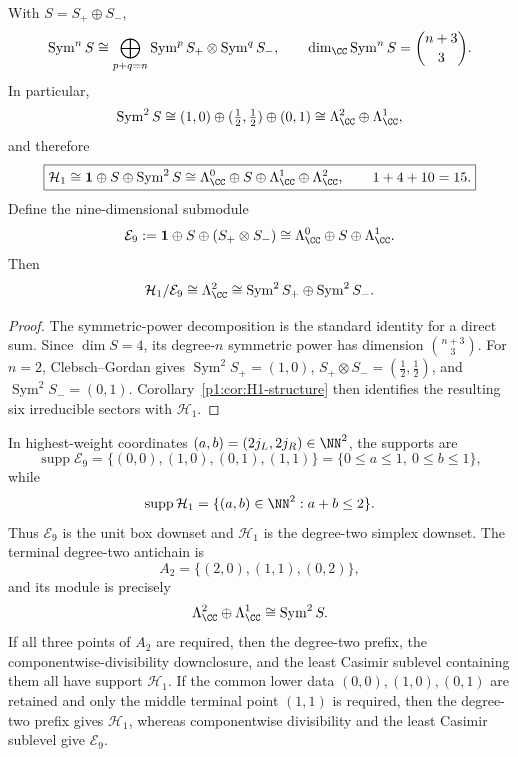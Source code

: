 \documentclass[11pt]{article}
\begin{document}
\begin{proposition}
\label{p1:prop:h1-symmetric-exterior-form}
With \(S=S_+\oplus S_-\),
\[
 \operatorname{Sym}^nS
 \cong
 \bigoplus_{p+q=n}
 \operatorname{Sym}^pS_+\otimes\operatorname{Sym}^qS_-,
 \qquad
 \dim_\CC\operatorname{Sym}^nS=\binom{n+3}{3}.
\]
In particular,
\[
 \operatorname{Sym}^2S
 \cong
 (1,0)\oplus(\tfrac12,\tfrac12)\oplus(0,1)
 \cong \Lambda^2_\CC\oplus\Lambda^1_\CC,
\]
and therefore
\[
 \boxed{
 \mathcal H_1
 \cong \mathbf1\oplus S\oplus\operatorname{Sym}^2S
 \cong \Lambda^0_\CC\oplus S\oplus\Lambda^1_\CC\oplus\Lambda^2_\CC,
 \qquad 1+4+10=15.}
\]
Define the nine-dimensional submodule
\[
 \mathcal E_9
 :=\mathbf1\oplus S\oplus(S_+\otimes S_-)
 \cong \Lambda^0_\CC\oplus S\oplus\Lambda^1_\CC.
\]
Then
\[
 \mathcal H_1/\mathcal E_9
 \cong\Lambda^2_\CC
 \cong\operatorname{Sym}^2S_+\oplus\operatorname{Sym}^2S_-.
\]
\end{proposition}

\begin{proof}
The symmetric-power decomposition is the standard identity for a direct sum.
Since \(\dim S=4\), its degree-\(n\) symmetric power has dimension
\(\binom{n+3}{3}\).  For \(n=2\), Clebsch--Gordan gives
\(\operatorname{Sym}^2S_+=(1,0)\),
\(S_+\otimes S_-=(\tfrac12,\tfrac12)\), and
\(\operatorname{Sym}^2S_-=(0,1)\).  Corollary~\ref{p1:cor:H1-structure}
then identifies the resulting six irreducible sectors with \(\mathcal H_1\).
\end{proof}

\begin{proposition}
\label{p1:prop:box-simplex-antichain}
In highest-weight coordinates \((a,b)=(2j_L,2j_R)\in\NN^2\), the supports are
\[
 \operatorname{supp}\mathcal E_9
 =\{(0,0),(1,0),(0,1),(1,1)\}
 =\{0\le a\le1,\ 0\le b\le1\},
\]
while
\[
 \operatorname{supp}\mathcal H_1
 =\{(a,b)\in\NN^2:a+b\le2\}.
\]
Thus \(\mathcal E_9\) is the unit box downset and \(\mathcal H_1\) is the
degree-two simplex downset.  The terminal degree-two antichain is
\[
 A_2=\{(2,0),(1,1),(0,2)\},
\]
and its module is precisely
\[
 \Lambda^2_\CC\oplus\Lambda^1_\CC
 \cong\operatorname{Sym}^2S.
\]
If all three points of \(A_2\) are required, then the degree-two prefix, the
componentwise-divisibility downclosure, and the least Casimir sublevel
containing them all have support \(\mathcal H_1\).  If the common lower data
\((0,0),(1,0),(0,1)\) are retained and only the middle terminal point
\((1,1)\) is required, then the degree-two prefix gives \(\mathcal H_1\),
whereas componentwise divisibility and the least Casimir sublevel give
\(\mathcal E_9\).
\end{proposition}
\end{document}
